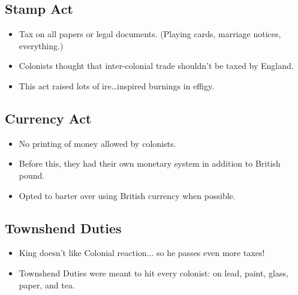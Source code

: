\documentclass{article}
\begin{document}
  \subsection{Stamp Act}
    \begin{itemize}
      \item Tax on all papers or legal documents. (Playing cards, marriage notices, everything.)
      \item Colonists thought that inter-colonial trade shouldn't be taxed by England.
      \item This act raised lots of ire\ldots inspired burnings in effigy.
    \end{itemize}
  \subsection{Currency Act}
    \begin{itemize}
      \item No printing of money allowed by colonists.
      \item Before this, they had their own monetary system in addition to British pound.
      \item Opted to barter over using British currency when possible.
    \end{itemize}
  \subsection{Townshend Duties}
    \begin{itemize}
      \item King doesn't like Colonial reaction... so he passes even more taxes!
      \item Townshend Duties were meant to hit every colonist: on lead, paint, glass, paper, and tea.
    \end{itemize}
\end{document}
